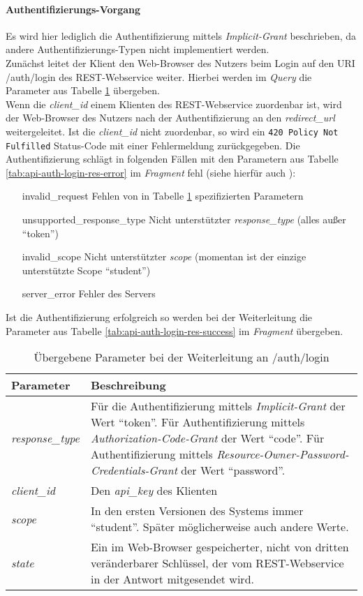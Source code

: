 \paragraph{Authentifizierungs-Vorgang}
Es wird hier lediglich die Authentifizierung mittels \textit{Implicit-Grant} beschrieben, da andere Authentifizierungs-Typen nicht implementiert werden.\\
Zunächst leitet der Klient den Web-Browser des Nutzers beim Login auf den URI /auth/login des REST-Webservice weiter. Hierbei werden im \textit{Query}  die Parameter aus Tabelle \ref{tab:api-auth-login-req-params} übergeben.\\
Wenn die \textit{client\_id} einem Klienten des REST-Webservice zuordenbar ist, wird der Web-Browser des Nutzers nach der Authentifizierung an den \textit{redirect\_url} weitergeleitet. Ist die \textit{client\_id} nicht zuordenbar, so wird ein \verb|420 Policy Not Fulfilled| Status-Code mit einer Fehlermeldung zurückgegeben.
Die Authentifizierung schlägt in folgenden Fällen mit den Parametern aus Tabelle \ref{tab:api-auth-login-res-error} im \textit{Fragment} fehl (siehe hierfür auch \cite[Kap. 4.2.2.1]{rfc6749}):
\begin{itemize}
	\item[invalid\_request] Fehlen von in Tabelle \ref{tab:api-auth-login-req-params} spezifizierten Parametern
	\item[unsupported\_response\_type] Nicht unterstützter \textit{response\_type} (alles außer \enquote{token})
	\item[invalid\_scope] Nicht unterstützter \textit{scope} (momentan ist der einzige unterstützte Scope \enquote{student})
	\item[server\_error] Fehler des Servers
\end{itemize}
Ist die Authentifizierung erfolgreich so werden bei der Weiterleitung die Parameter aus Tabelle \ref{tab:api-auth-login-res-success} im \textit{Fragment} übergeben.
\begin{table}
	\begin{tabularx}{\textwidth}{@{} | X | X | @{}}
		\hline
		\textbf{Parameter} & \textbf{Beschreibung}\\ \hline \hline
		\textit{response\_type} & Für die Authentifizierung mittels \textit{Implicit-Grant} der Wert \enquote{token}. Für Authentifizierung mittels \textit{Authorization-Code-Grant} der Wert \enquote{code}. Für Authentifizierung mittels \textit{Resource-Owner-Password-Credentials-Grant} der Wert \enquote{password}. \\ \hline
		\textit{client\_id} & Den \textit{api\_key} des Klienten \\ \hline
		\textit{scope} & In den ersten Versionen des Systems immer \enquote{student}. Später möglicherweise auch andere Werte. \\ \hline
		\textit{state} & Ein im Web-Browser gespeicherter, nicht von dritten veränderbarer Schlüssel, der vom REST-Webservice in der Antwort mitgesendet wird.\\
		\hline
	\end{tabularx}
	\caption{Übergebene Parameter bei der Weiterleitung an /auth/login}
	\label{tab:api-auth-login-req-params}
\end{table}


